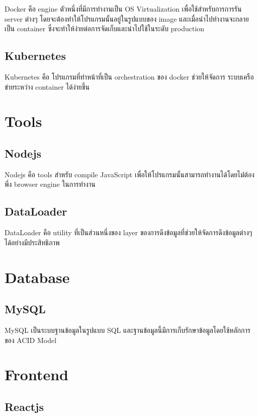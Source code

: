 Docker \cite{docker} คือ engine ตัวหนึ่งที่มีการทำงานเป็น OS Virtualization \cite {osvirtual} เพื่อใช้สำหรับการการรัน server ต่างๆ โดยจะต้องทำให้โปรแกรมนั้นอยู่ในรูปแบบของ image และเมื่อนำไปทำงานจะกลายเป็น container ซึ่งจะทำให้ง่ายต่อการจัดเก็บและนำไปใช้ในระดับ production

\subsection{Kubernetes}

Kubernetes \cite{kubernetes} คือ โปรแกรมที่ทำหน้าที่เป็น orchestration \cite  {orchestration} ของ docker ช่วยให้จัดการ ระบบเครือข่ายระหว่าง container ได้ง่ายขึ้น

\section{Tools}

\subsection{Nodejs}

Nodejs \cite{nodejs} คือ tools สำหรับ compile JavaScript \cite{javascript} เพื่อให้โปรแกรมนั้นสามารถทำงานได้โดยไม่่ต้องพึ่ง browser engine ในการทำงาน

\subsection{DataLoader}

DataLoader \cite{dataloader} คือ utility ที่เป็นส่วนหนึ่งของ layer ของการดึงข้อมูลที่ช่วยให้จัดการดึงข้อมูลต่างๆ ได้อย่างมีประสิทธิภาพ


\section{Database}
\subsection{MySQL}

MySQL เป็นระบบฐานข้อมูลในรูปแบบ SQL และฐานข้อมูลนี้มีการเก็บรักษาข้อมูลโดยใช้หลักการของ ACID Model \cite{acid}

\section{Frontend}

\subsection{Reactjs}

